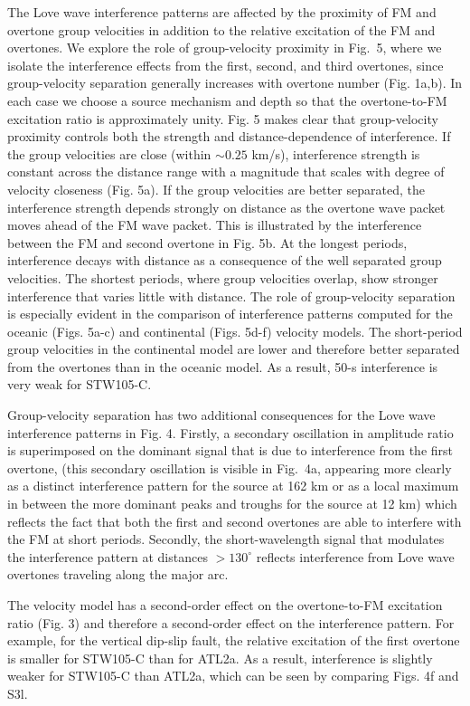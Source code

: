 \documentclass[extra,mreferee]{gji}
\begin{document}
The Love wave interference patterns are affected by the proximity of FM and overtone group velocities in addition to the relative excitation of the FM and overtones. We explore the role of group-velocity proximity in Fig.\ 5, where we isolate the interference effects from the first, second, and third overtones, since group-velocity separation generally increases with overtone number (Fig. 1a,b). In each case we choose a source mechanism and depth so that the overtone-to-FM excitation ratio is approximately unity. Fig. 5 makes clear that group-velocity proximity controls both the strength and distance-dependence of interference. If the group velocities are close (within $ \sim 0.25$ km/s), interference strength is constant across the distance range with a magnitude that scales with degree of velocity closeness (Fig. 5a). If the group velocities are better separated, the interference strength depends strongly on distance as the overtone wave packet moves ahead of the FM wave packet. This is illustrated by the interference between the FM and second overtone in Fig. 5b. At the longest periods, interference decays with distance as a consequence of the well separated group velocities. The shortest periods, where group velocities overlap, show stronger interference that varies little with distance. The role of group-velocity separation is especially evident in the comparison of interference patterns computed for the oceanic (Figs. 5a-c) and continental (Figs. 5d-f) velocity models. The short-period group velocities in the continental model are lower and therefore better separated from the overtones than in the oceanic model. As a result, 50-s interference is very weak for STW105-C.

Group-velocity separation has two additional consequences for the Love wave interference patterns in Fig. 4. Firstly, a secondary oscillation in amplitude ratio is superimposed on the dominant signal that is due to interference from the first overtone, (this secondary oscillation is visible in Fig.\ 4a, appearing more clearly as a distinct interference pattern for the source at 162 km or as a local maximum in between the more dominant peaks and troughs for the source at 12 km) which reflects the fact that both the first and second overtones are able to interfere with the FM at short periods. Secondly, the short-wavelength signal that modulates the interference pattern at distances $> 130^\circ$  reflects interference from Love wave overtones traveling along the major arc.

The velocity model has a second-order effect on the overtone-to-FM excitation ratio (Fig. 3) and therefore a second-order effect on the interference pattern. For example, for the vertical dip-slip fault, the relative excitation of the first overtone is smaller for STW105-C than for ATL2a. As a result, interference is slightly weaker for STW105-C than ATL2a, which can be seen by comparing Figs. 4f and S3l.
\end{document}
